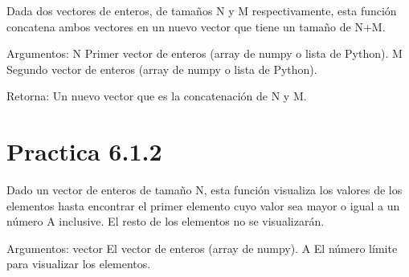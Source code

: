 \documentclass[letterpaper,10pt,spanish]{sphinxmanual}
\begin{document}
\begin{fulllineitems}
\label{\detokenize{pr6:pr6.1_1.concatenar_vectores}}
\pysigstartsignatures
{}
\pysigstopsignatures
\sphinxAtStartPar
Dada dos vectores de enteros, de tamaños N y M respectivamente, esta función concatena ambos vectores
en un nuevo vector que tiene un tamaño de N+M.

\sphinxAtStartPar
Argumentos:
N \textendash{} Primer vector de enteros (array de numpy o lista de Python).
M \textendash{} Segundo vector de enteros (array de numpy o lista de Python).

\sphinxAtStartPar
Retorna:
Un nuevo vector que es la concatenación de N y M.

\end{fulllineitems}



\section{Practica 6.1.2}
\label{\detokenize{pr6:module-pr6.1_2}}\label{\detokenize{pr6:practica-6-1-2}}

\begin{fulllineitems}
\label{\detokenize{pr6:pr6.1_2.visualizar_hasta_valor}}
\pysigstartsignatures
{}
\pysigstopsignatures
\sphinxAtStartPar
Dado un vector de enteros de tamaño N, esta función visualiza los valores de los elementos
hasta encontrar el primer elemento cuyo valor sea mayor o igual a un número A inclusive.
El resto de los elementos no se visualizarán.

\sphinxAtStartPar
Argumentos:
vector \textendash{} El vector de enteros (array de numpy).
A \textendash{} El número límite para visualizar los elementos.

\end{fulllineitems}
\end{document}
